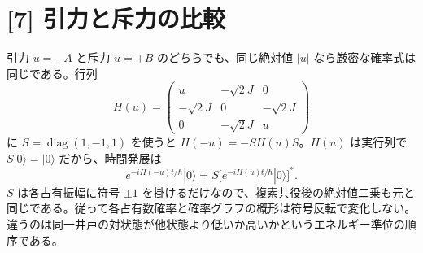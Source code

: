 \documentclass[11pt,a4paper]{article}
\begin{document}
\section*{[7] 引力と斥力の比較}
引力 $u=-A$ と斥力 $u=+B$ のどちらでも、同じ絶対値 $|u|$ なら厳密な確率式は同じである。行列
\begin{equation}
 H(u)=\begin{pmatrix}u&-\sqrt2J&0\\-\sqrt2J&0&-\sqrt2J\\0&-\sqrt2J&u\end{pmatrix}
\end{equation}
に $S=\operatorname{diag}(1,-1,1)$ を使うと $H(-u)=-S H(u)S$。$H(u)$ は実行列で $S|0\rangle=|0\rangle$ だから、時間発展は
\begin{equation}
 e^{-iH(-u)t/\hbar}|0\rangle
 =S\bigl[e^{-iH(u)t/\hbar}|0\rangle\bigr]^*.
\end{equation}
$S$ は各占有振幅に符号 $\pm1$ を掛けるだけなので、複素共役後の絶対値二乗も元と同じである。従って各占有数確率と確率グラフの概形は符号反転で変化しない。違うのは同一井戸の対状態が他状態より低いか高いかというエネルギー準位の順序である。
\end{document}
